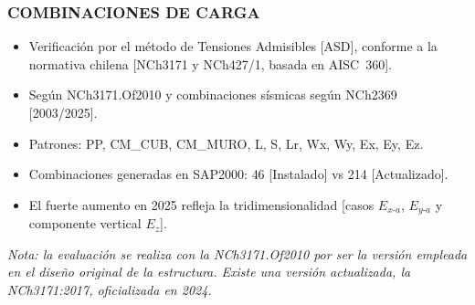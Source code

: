 ﻿\documentclass[11.5pt,aspectratio=169,handout]{beamer}
\newcommand{\ctitle}[1]{\frametitle{#1}}
\begin{document}
\begin{frame}
\ctitle{COMBINACIONES DE CARGA}
\vspace{1mm}
\begin{itemize}\small\setlength{\itemsep}{3mm}
  \item Verificación por el método de \alert{Tensiones Admisibles [ASD]}, conforme a la
        normativa chilena [NCh3171 y NCh427/1, basada en AISC~360].
  \item Según \alert{NCh3171.Of2010} y combinaciones sísmicas
        según NCh2369 [2003/2025].
  \item Patrones: PP, CM\_CUB, CM\_MURO, L, S,
        Lr, Wx, Wy, Ex, Ey, Ez.
  \item Combinaciones generadas en SAP2000: \alert{46}
        [Instalado] vs \alert{214} [Actualizado].
  \item El fuerte aumento en 2025 refleja la
        \alert{tridimensionalidad} [casos $E_{x\text{-}a}$, $E_{y\text{-}a}$ y
        componente vertical $E_z$].
\end{itemize}
\vspace{2mm}
{\scriptsize\textit{Nota: la evaluación se realiza con la \textmd{NCh3171.Of2010}
por ser la versión empleada en el diseño original de la estructura. Existe una versión
actualizada, la \textmd{NCh3171:2017}, oficializada en 2024.}}
\end{frame}

\end{document}

